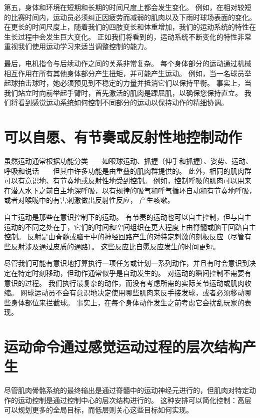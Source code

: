 第五，身体和环境在短期和长期的时间尺度上都会发生变化。
例如，在相对较短的比赛时间内，运动员必须纠正因疲劳而减弱的肌肉以及下雨时球场表面的变化。
在更长的时间尺度上，随着我们的四肢变长和体重增加，我们的运动系统的特性在生长过程中会发生巨大变化。 
正如我们将看到的，运动系统不断变化的特性非常重视我们使用运动学习来适当调整控制的能力。


最后，电机指令与后续动作之间的关系非常复杂。
每个身体部分的运动通过机械相互作用在所有其他身体部分产生扭矩，并可能产生运动。
例如，当一名球员举起球拍击球时，她必须预见到不稳定的力量并抵消它们以保持平衡。
事实上，当我们站立时向前举起手臂时，首先激活的肌肉是踝屈肌，以确保您保持直立。
我们将看到感觉运动系统如何控制不同部分的运动以保持动作的精细协调。



\section{可以自愿、有节奏或反射性地控制动作}

虽然运动通常根据功能分类——如眼球运动、抓握（伸手和抓握）、姿势、运动、呼吸和说话——但其中许多功能是由重叠的肌肉群提供的。
此外，相同的肌肉群可以有意识地、有节奏地或反射性地受到控制。
例如，控制呼吸的肌肉可以用来在潜入水下之前自主地深呼吸，以有规律的吸气和呼气循环自动和有节奏地呼吸，或者对喉咙中的有害刺激做出反射性反应， 产生咳嗽。


自主运动是那些在意识控制下的运动。
有节奏的运动也可以自主控制，但与自主运动的不同之处在于，它们的时间和空间组织在更大程度上由脊髓或脑干回路自主控制。
反射是由脊髓或脑干中的神经回路产生的对特定刺激的刻板反应（尽管有些反射涉及通过皮质的通路）。
这些反应比自愿反应发生的时间更短。


尽管我们可能有意识地打算执行一项任务或计划一系列动作，并且有时会意识到决定在特定时刻移动，但动作通常似乎是自动发生的。
对运动的瞬间控制不需要有意识的过程。
我们执行最复杂的动作，而没有考虑所需的实际关节运动或肌肉收缩。
网球运动员不会有意识地决定使用哪些肌肉来反手接发球，或者必须移动哪些身体部位来拦截球。
事实上，在每个身体动作发生之前考虑它会扰乱玩家的表现。



\section{运动命令通过感觉运动过程的层次结构产生}

尽管肌肉骨骼系统的最终输出是通过脊髓中的运动神经元进行的，但肌肉对特定动作的运动控制是通过控制中心的层次结构进行的。
这种安排可以简化控制：高层可以规划更多的全局目标，而低层则关心这些目标如何实现。


